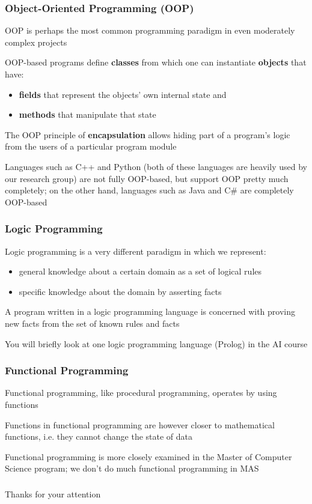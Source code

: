 \documentclass{beamer}
\begin{document}
\begin{frame}
\frametitle{Object-Oriented Programming (OOP)}
    OOP is perhaps the most common programming paradigm in even moderately complex projects
    \newline

    OOP-based programs define \textbf{classes} from which one can instantiate \textbf{objects} that have:
    \begin{itemize}
        \item \textbf{fields} that represent the objects' own internal state and
        \item \textbf{methods} that manipulate that state
    \end{itemize}

    The OOP principle of \textbf{encapsulation} allows hiding part of a program's logic from the users of a particular program module
    \newline

    Languages such as C++ and Python (both of these languages are heavily used by our research group) are not fully OOP-based, but support OOP pretty much completely; on the other hand, languages such as Java and C\# are completely OOP-based
\end{frame}

\begin{frame}
\frametitle{Logic Programming}
    Logic programming is a very different paradigm in which we represent:
    \begin{itemize}
        \item general knowledge about a certain domain as a set of logical rules
        \item specific knowledge about the domain by asserting facts
        \newline
    \end{itemize}
    A program written in a logic programming language is concerned with proving new facts from the set of known rules and facts
    \newline

    You will briefly look at one logic programming language (Prolog) in the AI course
\end{frame}

\begin{frame}
\frametitle{Functional Programming}
    Functional programming, like procedural programming, operates by using functions
    \newline

    Functions in functional programming are however closer to mathematical functions, i.e. they cannot change the state of data
    \newline

    Functional programming is more closely examined in the Master of Computer Science program; we don't do much functional programming in MAS
\end{frame}

\begin{frame}
\frametitle{}
    \begin{center}
        {\huge Thanks for your attention}
    \end{center}
\end{frame}
\end{document}
